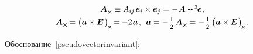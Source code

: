 \begin{otherlanguage}{russian}
\nopagebreak\vspace{-0.15em}\begin{equation}\label{pseudovectorinvariant}
\begin{array}{c}
\bm{A}_{\Xcompanion} \equiv A_{i\hspace{-0.1ex}j} \hspace{.25ex} \bm{e}_i \times \bm{e}_j = - \hspace{.1ex} \bm{A} \hspace{.1ex} \dotdotp \levicivitatensor
\hspace{.2ex}, \\[.3em]
%
\bm{A}_{\Xcompanion} \hspace{-0.16ex} = \left(^{\mathstrut} \hspace{-0.1ex} \bm{a} \times\hspace{-0.1ex} \bm{E} \hspace{.2ex} \right)_{\hspace{-0.25ex}\Xcompanion} \hspace{-0.25ex} = \hspace{-0.12ex}
- 2 \hspace{.16ex} \bm{a} \hspace{.2ex},\:\:
\bm{a} = - \hspace{.2ex} \smalldisplaystyleonehalf \hspace{.25ex} \bm{A}_{\Xcompanion} = - \hspace{.2ex} \smalldisplaystyleonehalf \left(^{\mathstrut} \hspace{-0.1ex} \bm{a} \times\hspace{-0.1ex} \bm{E} \hspace{.2ex} \right)_{\hspace{-0.25ex}\Xcompanion} \hspace{-0.2ex}.
\end{array}
\end{equation}

Обоснование~\eqref{pseudovectorinvariant}:


\end{otherlanguage}
